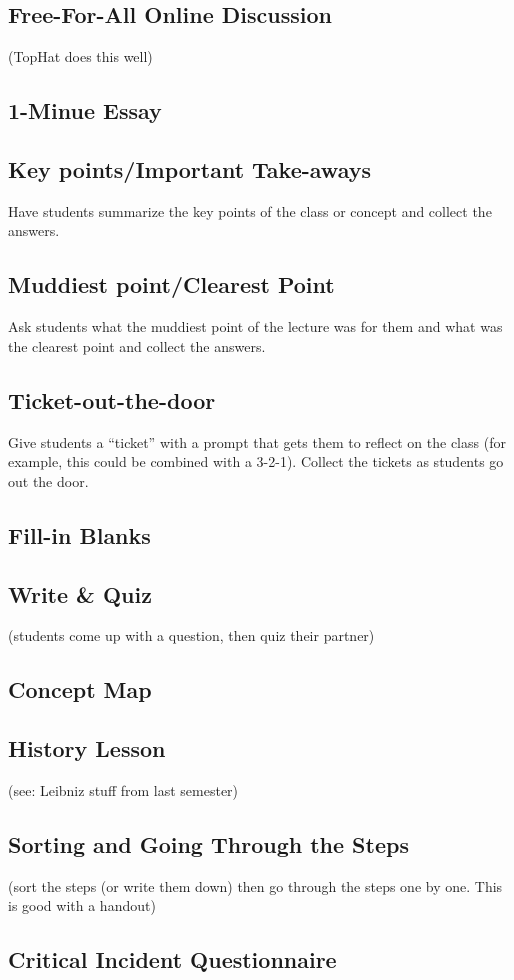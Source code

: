 \subsection*{Free-For-All Online Discussion}
(TopHat does this well)
\subsection*{1-Minue Essay}
\subsection*{Key points/Important Take-aways}
Have students summarize the key points of the class or concept and collect the answers. 
\subsection*{Muddiest point/Clearest Point}
Ask students what the muddiest point of the lecture was for them and what was the clearest point and collect the answers. 
\subsection*{Ticket-out-the-door}
Give students a ``ticket'' with a prompt that gets them to reflect on the class (for example, this could be combined with a 3-2-1). Collect the tickets as students go out the door. 
\subsection*{Fill-in Blanks}
\subsection*{Write \& Quiz}
(students come up with a question, then quiz their partner)
\subsection*{Concept Map}
\subsection*{History Lesson}
(see: Leibniz stuff from last semester)
\subsection*{Sorting and Going Through the Steps}
(sort the steps (or write them down) then go through 
the steps one by one. This is good with a handout)
\subsection*{Critical Incident Questionnaire}
